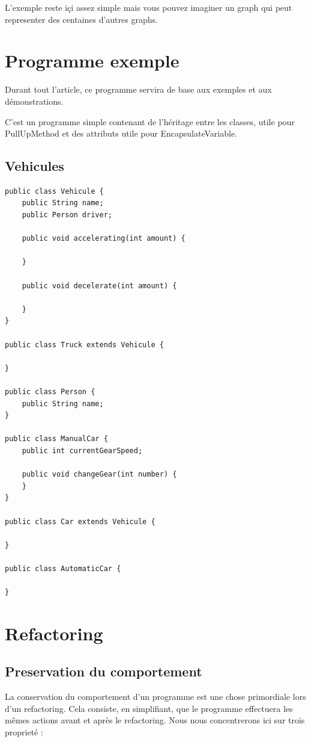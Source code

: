 \documentclass[a4paper, 12pt]{article}
\begin{document}
L'exemple reste içi assez simple mais vous pouvez imaginer un graph qui peut representer des centaines d'autres graphs.

\newpage
\section{Programme exemple}

Durant tout l'article, ce programme servira de base aux exemples et aux démonstrations.

C'est un programme simple contenant de l'héritage entre les classes, utile pour PullUpMethod et des attributs utile pour EncapsulateVariable.

\subsection{Vehicules}

\begin{lstlisting}[frame=single]
public class Vehicule {
	public String name;
	public Person driver;

	public void accelerating(int amount) {

	}

	public void decelerate(int amount) {
	
	}
}

public class Truck extends Vehicule {

}

public class Person {
	public String name;
}

public class ManualCar {
	public int currentGearSpeed;
	
	public void changeGear(int number) {
	}
}

public class Car extends Vehicule {

}

public class AutomaticCar {

}
\end{lstlisting}

\newpage
\section{Refactoring}

\subsection{Preservation du comportement}
\label{subsec:preservationDuComportement}
La conservation du comportement d'un programme est une chose primordiale lors d'un refactoring. Cela consiste, en simplifiant, que le programme effectuera les mêmes actions avant et après le refactoring. Nous nous concentrerons ici sur trois proprieté :
\end{document}
